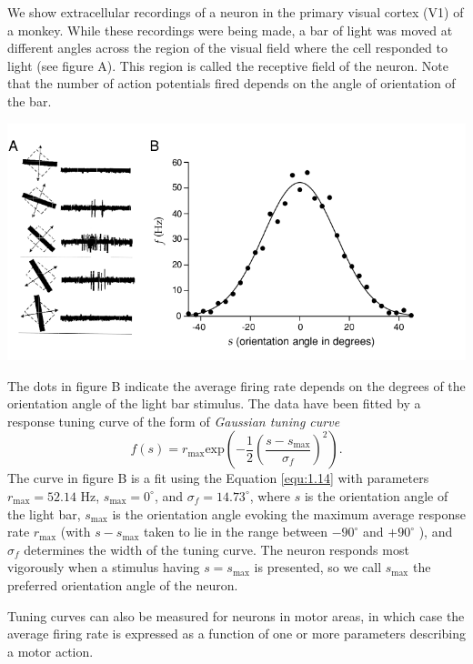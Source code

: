 \begin{exm}
  \label{fig:1.5}
   We show extracellular recordings of a neuron in the primary visual cortex (V1) of a monkey. While these recordings were being made, a bar of light was moved at different angles across the region of the visual field where the cell responded to light (see figure A). This region is called the receptive  field of the neuron. Note that the number of action potentials fired depends on the angle of orientation of the bar.
\begin{center}
  \includegraphics[scale=0.32]{./png/fig_1_5.png}
\end{center}
The dots in figure B indicate the average firing rate depends on the degrees of the orientation angle of the light bar stimulus.
The data have been fitted by a response tuning curve of the form of \emph{Gaussian tuning curve}
\begin{equation}
  \label{equ:1.14}
  f(s)=r_{\text{max}}\text{exp}\left(-\frac{1}{2}\left(\frac{s-s_{\text{max}}}{\sigma_f}\right)^2\right).
\end{equation}
The curve  in figure B is a fit using
the Equation \ref{equ:1.14} with parameters $r_{\text{max}} = 52 . 14 $ Hz, $s_{\text{max}}= 0 ^\circ$,
 and $\sigma_f= 14 . 73 ^\circ $,
where $s$ is the orientation angle of the light bar, $s_{\text{max}}$ is the orientation angle
evoking the maximum average response rate $r_{\text{max}}$ (with $s-s_{\text{max}} $ taken 
to lie in the range between $- 90^\circ $ and $+90^\circ$  ), and $\sigma_f$ determines the 
width of the tuning curve. The neuron responds most vigorously when a stimulus
having $s=s_{\text{max}} $ is presented, so we call $s_{\text{max}}$ the preferred orientation angle
of the neuron.
\end{exm}

\begin{rem}
  Tuning curves can also be measured for neurons in motor areas, in which
case the average firing rate is expressed as a function of one or more parameters describing 
a motor action.
\end{rem}

